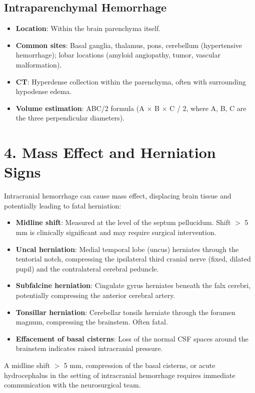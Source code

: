 \subsection{Intraparenchymal Hemorrhage}
\begin{itemize}
  \item \textbf{Location}: Within the brain parenchyma itself.
  \item \textbf{Common sites}: Basal ganglia, thalamus, pons, cerebellum (hypertensive hemorrhage); lobar locations (amyloid angiopathy, tumor, vascular malformation).
  \item \textbf{CT}: Hyperdense collection within the parenchyma, often with surrounding hypodense edema.
  \item \textbf{Volume estimation}: ABC/2 formula (A $\times$ B $\times$ C / 2, where A, B, C are the three perpendicular diameters).
\end{itemize}


\section{4. Mass Effect and Herniation Signs}

Intracranial hemorrhage can cause mass effect, displacing brain tissue and potentially leading to fatal herniation:

\begin{itemize}
  \item \textbf{Midline shift}: Measured at the level of the septum pellucidum. Shift $>$ 5 mm is clinically significant and may require surgical intervention.
  \item \textbf{Uncal herniation}: Medial temporal lobe (uncus) herniates through the tentorial notch, compressing the ipsilateral third cranial nerve (fixed, dilated pupil) and the contralateral cerebral peduncle.
  \item \textbf{Subfalcine herniation}: Cingulate gyrus herniates beneath the falx cerebri, potentially compressing the anterior cerebral artery.
  \item \textbf{Tonsillar herniation}: Cerebellar tonsils herniate through the foramen magnum, compressing the brainstem. Often fatal.
  \item \textbf{Effacement of basal cisterns}: Loss of the normal CSF spaces around the brainstem indicates raised intracranial pressure.
\end{itemize}

\begin{pearlbox}
A midline shift $>$ 5 mm, compression of the basal cisterns, or acute hydrocephalus in the setting of intracranial hemorrhage requires immediate communication with the neurosurgical team.
\end{pearlbox}


